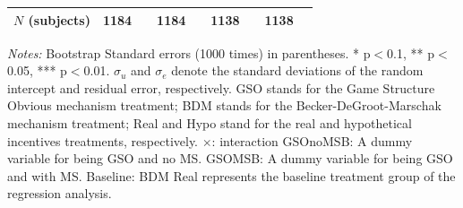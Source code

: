 \documentclass[12pt]{article}
\begin{document}
\begin{table}[H]
{\begin{tabular}{l*{4}{cc}}
\(N \) (subjects)      &        1184         &            &        1184         &            &        1138         &            &        1138         &            \\
\hline \hline
\end{tabular}
}




\begin{tablenotes}
          \footnotesize
           \item \textit{Notes:} Bootstrap Standard errors (1000 times) in parentheses. * p$<$0.1, ** p$<$0.05, *** p$<$0.01. $\sigma_u$ and $\sigma_e$ denote the standard deviations of the random intercept and residual error, respectively. GSO stands for the Game Structure Obvious mechanism treatment; BDM stands for the Becker-DeGroot-Marschak mechanism treatment; Real and Hypo stand for the real and hypothetical incentives treatments, respectively. $\times$: interaction GSOnoMSB: A dummy variable for being GSO and no MS. GSOMSB: A dummy variable for being GSO and with MS.
             Baseline: BDM Real represents the baseline treatment group of the regression analysis.
        \end{tablenotes}
            \end{table}

\clearpage
\end{document}
